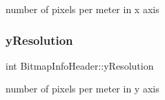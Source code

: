 number of pixels per meter in x axis 

\mbox{\label{group__bitmap_gaf2fadf9c216cc9f3ce401096e35be1b7}} 
\subsubsection{\texorpdfstring{y\+Resolution}{yResolution}}
{\footnotesize\ttfamily int Bitmap\+Info\+Header\+::y\+Resolution}



number of pixels per meter in y axis 

